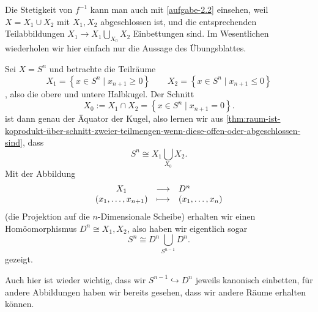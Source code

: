 \begin{remark*}
    Die Stetigkeit von $f^{-1}$ kann man auch mit \autoref{aufgabe-2.2} einsehen, weil $X = X_1 \cup X_2$ mit $X_1,X_2$ abgeschlossen ist, und die entsprechenden Teilabbildungen $X_1 \to X_1 \bigcup_{X_0} X_2$ Einbettungen sind. Im Wesentlichen wiederholen wir hier einfach nur die Aussage des Übungsblattes.
\end{remark*}

\begin{example}
    Sei $X = S^n$ und betrachte die Teilräume  \[
        X_1 = \left \{x\in S^n \mid  x_{n+1}\geq 0\right\} \qquad X_2 = \left \{x\in S^n \mid  x_{n+1} \leq 0\right\} 
    \]
    , also die obere und untere Halbkugel. Der Schnitt
    \[
    X_0 := X_1 \cap  X_2 = \left \{x\in S^n \mid  x_{n+1} = 0\right\} 
    .\] 
    ist dann genau der Äquator der Kugel, also lernen wir aus \autoref{thm:raum-ist-koprodukt-über-schnitt-zweier-teilmengen-wenn-diese-offen-oder-abgeschlossen-sind}, dass
     \[
    S^n \cong X_1 \bigcup_{X_0} X_2 
    .\] 
    Mit der Abbildung
        \begin{equation*}
        \begin{array}{c c l} 
        X_1 & \longrightarrow & D^n \\
        (x_1,\ldots,x_{n+1}) & \longmapsto &  (x_1,\ldots,x_n)
        \end{array}
    \end{equation*}
    (die Projektion auf die $n$-Dimensionale Scheibe) erhalten wir einen Homöomorphismus  $D^n \cong X_1, X_2$, also haben wir eigentlich sogar
    \[
    S^n \cong D^n \bigcup_{S^{n-1}} D^n
    .\] 
    gezeigt.
    \begin{warning}
        Auch hier ist wieder wichtig, dass wir $S^{n-1}\hookrightarrow D^n$ jeweils kanonisch einbetten, für andere Abbildungen haben wir bereits gesehen, dass wir andere Räume erhalten können.
    \end{warning}
\end{example}




